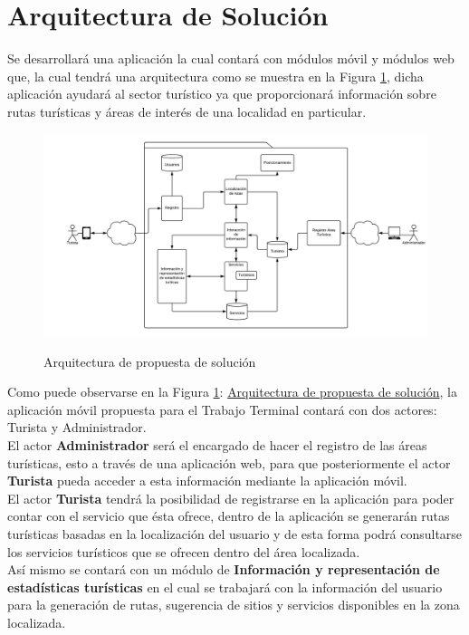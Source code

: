 \section{Arquitectura de Solución}
Se desarrollará una aplicación la cual contará con módulos móvil y módulos web que, la cual tendrá una arquitectura como se muestra en la Figura \ref{fig:arquitecturaPropuesta}, dicha aplicación ayudará al sector turístico ya que proporcionará información sobre rutas turísticas y áreas de interés de una localidad en particular.

\begin{figure}[htbp]
	\begin{center}
		\hypertarget{fig:arquitecturaPropuesta}{
			\includegraphics[scale=.4]{propuestaSolicion/turismo/images/arquitecturaPropuesta}
			\caption{Arquitectura de propuesta de solución}
		}
		\label{fig:arquitecturaPropuesta}
	\end{center}
\end{figure}

\newpage
Como puede observarse en la Figura \ref{fig:arquitecturaPropuesta}: \hyperlink{fig:arquitecturaPropuesta}{Arquitectura de propuesta de solución}, la aplicación móvil propuesta para el Trabajo Terminal contará con dos actores: Turista y Administrador.\\

El actor \textbf{Administrador} será el encargado de hacer el registro de las áreas turísticas, esto a través de una aplicación web,  para que posteriormente el actor \textbf{Turista} pueda acceder a esta información mediante la aplicación móvil. \\

El actor \textbf{Turista} tendrá la posibilidad de registrarse en la aplicación para poder contar con el servicio que ésta ofrece, dentro de la aplicación se generarán rutas turísticas basadas en la localización del usuario y de esta forma podrá consultarse los servicios turísticos que se ofrecen dentro del área localizada.\\

Así mismo se contará con un módulo de \textbf{Información y representación de estadísticas turísticas} en el cual se trabajará con la información del usuario para la generación de rutas, sugerencia de sitios y servicios disponibles en la zona localizada.
